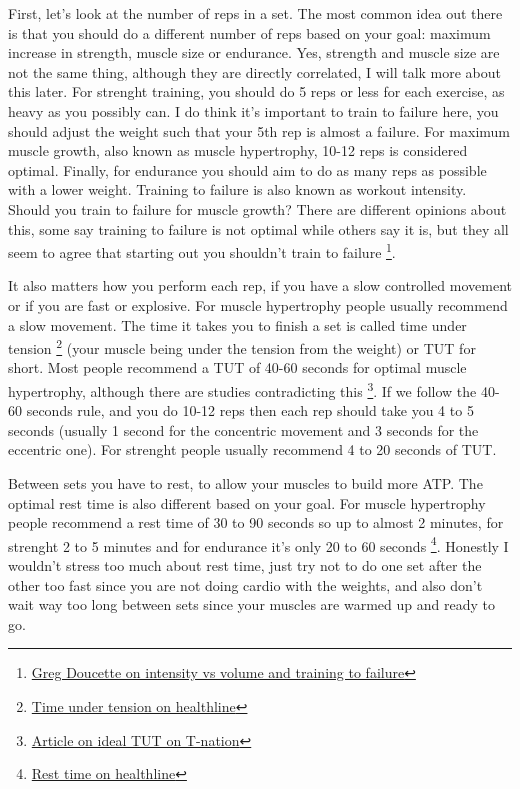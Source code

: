 \documentclass[openany, 12pt]{book}
\begin{document}
        First, let's look at the number of reps in a set. The most common idea out there is that you should do a different number of reps based on your goal: maximum increase in strength, muscle size or
        endurance. Yes, strength and muscle size are not the same thing, although they are directly correlated, I will talk more about this later. For strenght training, you should do 5 reps or less
        for each exercise, as heavy as you possibly can. I do think it's important to train to failure here, you should adjust the weight such that your 5th rep is almost a failure.
        For maximum muscle growth, also known as muscle hypertrophy, 10-12 reps is considered optimal. Finally, for endurance you should aim to do as many reps as possible with a lower weight.
        Training to failure is also known as workout intensity. Should you train to failure for muscle growth? There are different opinions about this, some say training to failure is not optimal
        while others say it is, but they all seem to agree that starting out you shouldn't train to failure
        \footnote{\href{https://www.youtube.com/watch?v=39YvjFRiGac}{Greg Doucette on intensity vs volume and training to failure}}.
        
        It also matters how you perform each rep, if you have a slow controlled movement or if you are fast or explosive. For muscle hypertrophy people usually recommend a slow movement.
        The time it takes you to finish a set is called time under tension
        \footnote{\href{https://www.healthline.com/health/exercise-fitness/time-under-tension}{Time under tension on healthline}}
        (your muscle being under the tension from the weight) or TUT for short. Most people recommend a TUT of 40-60 seconds for optimal muscle hypertrophy, although there are studies contradicting this
        \footnote{\href{https://www.t-nation.com/training/the-new-science-of-time-under-tension/}{Article on ideal TUT on T-nation}}. If we follow the 40-60 seconds rule, and you do 10-12 reps then
        each rep should take you 4 to 5 seconds (usually 1 second for the concentric movement and 3 seconds for the eccentric one). For strenght people usually recommend 4 to 20 seconds of TUT.

        Between sets you have to rest, to allow your muscles to build more ATP. The optimal rest time is also different based on your goal. For muscle hypertrophy people recommend a rest time of
        30 to 90 seconds so up to almost 2 minutes, for strenght 2 to 5 minutes and for endurance it's only 20 to 60 seconds
        \footnote{\href{https://www.healthline.com/health/fitness/rest-between-sets}{Rest time on healthline}}. Honestly I wouldn't stress too much about rest time, just try
        not to do one set after the other too fast since you are not doing cardio with the weights, and also don't wait way too long between sets since your muscles are warmed up and ready to go.
\end{document}
